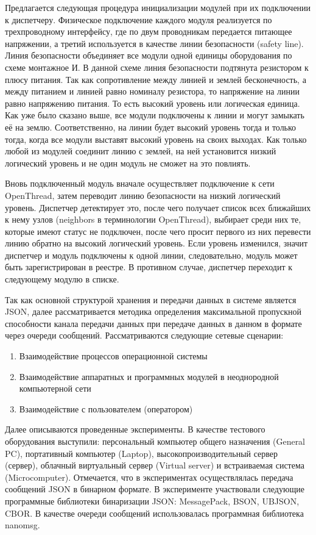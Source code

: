 Предлагается следующая процедура инициализации модулей при их подключении к диспетчеру. Физическое подключение каждого модуля реализуется по трехпроводному интерфейсу, где по двум проводникам передается питающее напряжении, а третий используется в качестве линии безопасности (safety line). Линия безопасности объединяет все модули одной единицы оборудования по схеме монтажное И. В данной схеме линия безопасности подтянута резистором к плюсу питания. Так как сопротивление между линией и землей бесконечность, а между питанием и линией равно номиналу резистора, то напряжение на линии равно напряжению питания. То есть высокий уровень или логическая единица. Как уже было сказано выше, все модули подключены к линии и могут замыкать её на землю. Соответственно, на линии будет высокий уровень тогда и только тогда, когда все модули выставят высокий уровень на своих выходах. Как только любой из модулей соединит линию с землей, на ней установится низкий логический уровень и не один модуль не сможет на это повлиять.

Вновь подключенный модуль вначале осуществляет подключение к сети OpenThread, затем переводит линию безопасности на низкий логический уровень. Диспетчер детектирует это, после чего получает список всех ближайших к нему узлов (neighbors в терминологии OpenThread), выбирает среди них те, которые имеют статус не подключен, после чего просит первого из них перевести линию обратно на высокий логический уровень. Если уровень изменился, значит диспетчер и модуль подключены к одной линии, следовательно, модуль может быть зарегистрирован в реестре. В противном случае, диспетчер переходит к следующему модулю в списке.

Так как основной структурой хранения и передачи данных в системе является JSON, далее рассматривается методика определения максимальной пропускной способности канала передачи данных при передаче данных в данном в формате через очереди сообщений. Рассматриваются следующие сетевые сценарии:

\begin{enumerate}
	\item Взаимодействие процессов операционной системы
	\item Взаимодействие аппаратных и программных модулей в неоднородной компьютерной сети
	\item Взаимодействие с пользователем (оператором)	
\end{enumerate}

Далее описываются проведенные эксперименты. В качестве тестового оборудования выступили: персональный компьютер общего назначения (General PC), портативный компьютер (Laptop), высокопроизводительный сервер (сервер), облачный виртуальный сервер (Virtual server) и встраиваемая система (Microcomputer). Отмечается, что в экспериментах осуществлялась передача сообщений JSON в бинарном формате. В эксперименте участвовали следующие программные библиотеки бинаризации JSON: MessagePack, BSON, UBJSON, CBOR. В качестве очереди сообщений использовалась программная библиотека nanomsg.

